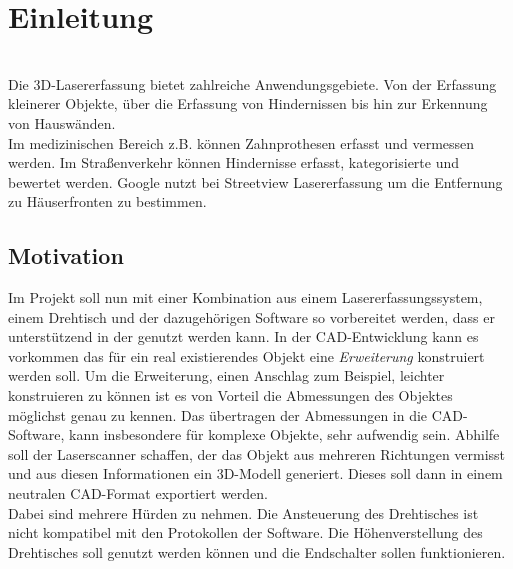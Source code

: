 \chapter{Einleitung}
\label{cha:Einleitung}
\\
Die 3D-Lasererfassung bietet zahlreiche Anwendungsgebiete. Von der Erfassung kleinerer Objekte, über die Erfassung von Hindernissen bis hin zur Erkennung von Hauswänden.\\
Im medizinischen Bereich z.B. können Zahnprothesen erfasst und vermessen werden. Im Straßenverkehr können Hindernisse erfasst, kategorisierte und bewertet werden. Google nutzt bei Streetview\cite{Ggl:StreetView} Lasererfassung um die Entfernung zu Häuserfronten zu bestimmen.

\section{Motivation}
\label{sec:Motivation}
Im Projekt soll nun mit einer Kombination aus einem Lasererfassungssystem, einem Drehtisch und der dazugehörigen Software so vorbereitet werden, dass er unterstützend in der  genutzt werden kann.
In der CAD-Entwicklung kann es vorkommen das für ein real existierendes Objekt eine \textit{Erweiterung} konstruiert werden soll. Um die Erweiterung, einen Anschlag zum Beispiel, leichter konstruieren zu können ist es von Vorteil die Abmessungen des Objektes möglichst genau zu kennen. Das übertragen der Abmessungen in die CAD-Software, kann insbesondere für komplexe Objekte, sehr aufwendig sein.
Abhilfe soll der Laserscanner schaffen, der das Objekt aus mehreren Richtungen vermisst und aus diesen Informationen ein 3D-Modell generiert. Dieses soll dann in einem neutralen CAD-Format  exportiert werden.\\
Dabei sind mehrere Hürden zu nehmen. Die Ansteuerung des Drehtisches ist nicht kompatibel mit den Protokollen der Software. Die Höhenverstellung des Drehtisches soll genutzt werden können und die Endschalter sollen funktionieren. 

